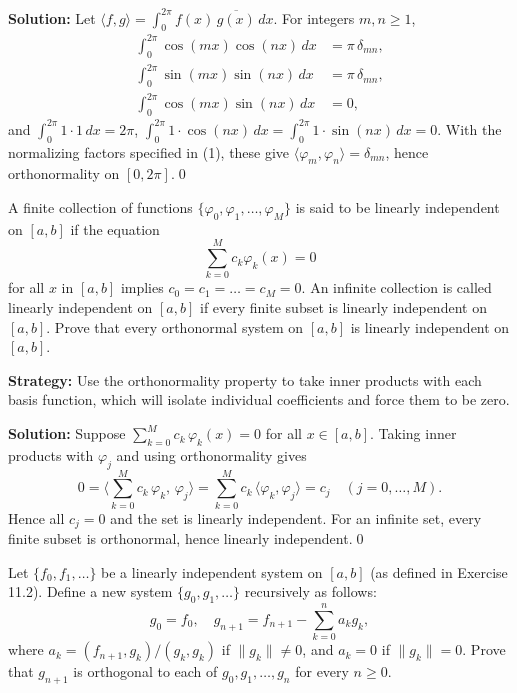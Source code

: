 \bigskip\noindent\textbf{Solution:}
Let $\langle f, g\rangle = \int_0^{2\pi} f(x)\,\overline{g(x)}\,dx$. For integers $m, n \ge 1$,
\begin{align*}
\int_0^{2\pi} \cos(mx)\cos(nx)\,dx &= \pi\,\delta_{mn},\\
\int_0^{2\pi} \sin(mx)\sin(nx)\,dx &= \pi\,\delta_{mn},\\
\int_0^{2\pi} \cos(mx)\sin(nx)\,dx &= 0,
\end{align*}
and $\int_0^{2\pi} 1\cdot 1\,dx = 2\pi$, $\int_0^{2\pi} 1\cdot \cos(nx)\,dx = \int_0^{2\pi} 1\cdot \sin(nx)\,dx = 0$. With the normalizing factors specified in (1), these give $\langle \varphi_m, \varphi_n\rangle = \delta_{mn}$, hence orthonormality on $[0,2\pi]$.\qed


\begin{problembox}
\begin{problemstatement}
A finite collection of functions $\{\varphi_0, \varphi_1, \dots, \varphi_M\}$ is said to be linearly independent on $[a, b]$ if the equation
\[
\sum_{k=0}^M c_k \varphi_k(x) = 0
\]
for all $x$ in $[a, b]$ implies $c_0 = c_1 = \dots = c_M = 0$. An infinite collection is called linearly independent on $[a, b]$ if every finite subset is linearly independent on $[a, b]$. Prove that every orthonormal system on $[a, b]$ is linearly independent on $[a, b]$.
\end{problemstatement}
\end{problembox}

\noindent\textbf{Strategy:} Use the orthonormality property to take inner products with each basis function, which will isolate individual coefficients and force them to be zero.

\bigskip\noindent\textbf{Solution:}
Suppose $\sum_{k=0}^M c_k\,\varphi_k(x)=0$ for all $x\in[a,b]$. Taking inner products with $\varphi_j$ and using orthonormality gives
\[
0 = \Big\langle \sum_{k=0}^M c_k\,\varphi_k,\,\varphi_j\Big\rangle = \sum_{k=0}^M c_k\,\langle\varphi_k,\varphi_j\rangle = c_j\quad (j=0,\dots,M).
\]
Hence all $c_j=0$ and the set is linearly independent. For an infinite set, every finite subset is orthonormal, hence linearly independent.\qed


\begin{problembox}
\begin{problemstatement}
Let $\{f_0, f_1, \dots\}$ be a linearly independent system on $[a, b]$ (as defined in Exercise 11.2). Define a new system $\{g_0, g_1, \dots\}$ recursively as follows:
\[
g_0 = f_0, \quad g_{n+1} = f_{n+1} - \sum_{k=0}^n a_k g_k,
\]
where $a_k = (f_{n+1}, g_k)/(g_k, g_k)$ if $\|g_k\| \neq 0$, and $a_k = 0$ if $\|g_k\| = 0$. Prove that $g_{n+1}$ is orthogonal to each of $g_0, g_1, \dots, g_n$ for every $n \geq 0$.
\end{problemstatement}
\end{problembox}

